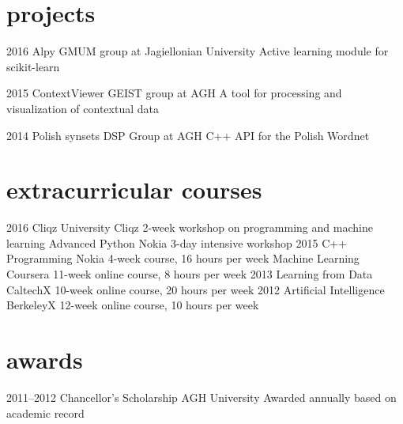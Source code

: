 \documentclass[]{friggeri-cv_osx}
\begin{document}
\section{projects}
\begin{entrylist}
\entry
{2016}
{Alpy}
{GMUM group at Jagiellonian University}
{Active learning module for scikit-learn}

\entry
{2015}
{ContextViewer}
{GEIST group at AGH}
{A tool for processing and visualization of contextual data}

\entry
{2014}
{Polish synsets}
{DSP Group at AGH}
{C++ API for the Polish Wordnet\\}
\end{entrylist}

\section{extracurricular courses}
\begin{entrylist}
\entry
{2016}
{Cliqz University}
{Cliqz}
{2-week workshop on programming and machine learning}
\entry
{}
{Advanced Python}
{Nokia}
{3-day intensive workshop}
\entry
{2015}
{C++ Programming}
{Nokia}
{4-week course, 16 hours per week}
\entry
{}
{Machine Learning}
{Coursera}
{11-week online course, 8 hours per week}
\entry
{2013}
{Learning from Data}
{CaltechX}
{10-week online course, 20 hours per week}
\entry
{2012}
{Artificial Intelligence}
{BerkeleyX}
{12-week online course, 10 hours per week}
\end{entrylist}


\section{awards}
\begin{entrylist}
\entry
{2011--2012}
{Chancellor's Scholarship}
{AGH University}
{Awarded annually based on academic record}
\end{entrylist}
\end{document}
